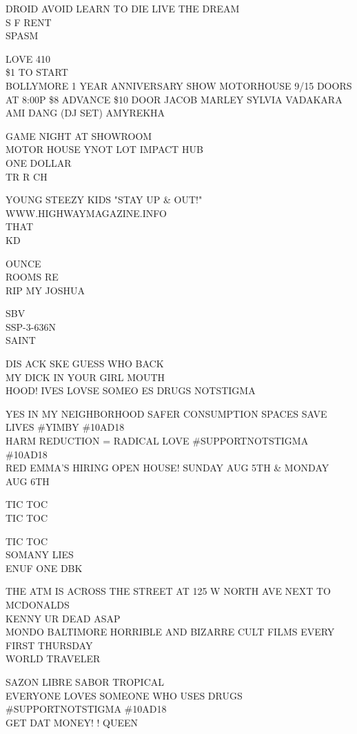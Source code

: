 \documentclass[10pt,letterpaper]{article}
\begin{document}
DROID AVOID LEARN TO DIE LIVE THE DREAM\\
S F RENT\\
SPASM

LOVE 410\\
\$1 TO START\\
BOLLYMORE 1 YEAR ANNIVERSARY SHOW MOTORHOUSE 9/15 DOORS AT 8:00P \$8 ADVANCE \$10 DOOR JACOB MARLEY SYLVIA VADAKARA AMI DANG (DJ SET) AMYREKHA

GAME NIGHT AT SHOWROOM\\
MOTOR HOUSE YNOT LOT IMPACT HUB\\
ONE DOLLAR\\
TR R CH

YOUNG STEEZY KIDS "STAY UP \& OUT!"\\
WWW.HIGHWAYMAGAZINE.INFO\\
THAT\\
KD

OUNCE\\
ROOMS RE\\
RIP MY JOSHUA

SBV\\
SSP{-}3{-}636N\\
SAINT

DIS ACK SKE GUESS WHO BACK\\
MY DICK IN YOUR GIRL MOUTH\\
HOOD!  IVES LOVSE SOMEO ES DRUGS NOTSTIGMA

YES IN MY NEIGHBORHOOD SAFER CONSUMPTION SPACES SAVE LIVES \#YIMBY \#10AD18\\
HARM REDUCTION = RADICAL LOVE \#SUPPORTNOTSTIGMA \#10AD18\\
RED EMMA'S HIRING OPEN HOUSE!   SUNDAY AUG 5TH \& MONDAY AUG 6TH

TIC TOC\\
TIC TOC

TIC TOC\\
SOMANY LIES\\
ENUF ONE DBK

THE ATM IS ACROSS THE STREET AT 125 W NORTH AVE NEXT TO MCDONALDS\\
KENNY UR DEAD ASAP\\
MONDO BALTIMORE HORRIBLE AND BIZARRE CULT FILMS EVERY FIRST THURSDAY\\
WORLD TRAVELER

SAZON LIBRE SABOR TROPICAL\\
EVERYONE LOVES SOMEONE WHO USES DRUGS \#SUPPORTNOTSTIGMA \#10AD18\\
GET DAT MONEY! ! QUEEN
\end{document}
